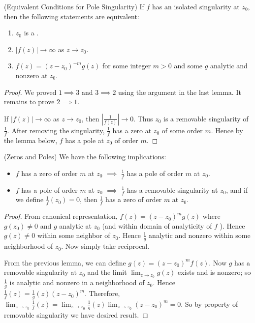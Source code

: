 \begin{theorem}(Equivalent Conditions for Pole Singularity)
	If $f$ has an isolated singularity at $z_0$, then the following statements are equivalent:
	\begin{enumerate}
		\item $z_0$ is a .
		\item $|f(z)| \to  \infty $ as $z \to  z_0$.
		\item $f(z) = (z-z_0)^{-m} g(z)$ for some integer $m>0$ and some $g$ analytic and nonzero at $z_0$.
	\end{enumerate}
\end{theorem}
\begin{proof}
	We proved $1 \implies 3$ and $3 \implies 2$ using the argument in the last lemma. It remains to prove $2 \implies 1$.

	If $|f(z)| \to \infty $ as $z \to  z_0$, then $|\frac{1}{f(z)}| \to  0$. Thus $z_0$ is a removable singularity of $\frac{1}{f}$. After removing the singularity, $\frac{1}{f}$ has a zero at $z_0$ of some order $m$. Hence by the lemma below, $f$ has a pole at $z_0$ of order $m$.
\end{proof}
\begin{lemma}(Zeros and Poles)
	We have the following implications:
	\begin{itemize}
		\item $f$ has a zero of order $m$ at $z_0$ $\implies$ $\frac{1}{f}$ has a pole of order $m$ at $z_0$.
		\item $f$ has a pole of order $m$ at $z_0$ $\implies$ $\frac{1}{f}$ has a removable singularity at $z_0$, and if we define $\frac{1}{f}(z_0) = 0$, then $\frac{1}{f}$ has a zero of order $m$ at $z_0$.
	\end{itemize}
\end{lemma}
\begin{proof}
	From canonical representation, $f(z) = (z-z_0)^m g(z)$ where $g(z_0)\neq 0$ and $g$ analytic at $z_0$ (and within domain of analyticity of  $f$ ). Hence $g(z)\neq 0$ within some neighbor of $z_0$. Hence $\frac{1}{g}$ analytic and nonzero within some neighborhood of $z_0$. Now simply take reciprocal.

	From the previous lemma, we can define  $g(z) = (z-z_0)^m f(z)$. Now $g$ has a removable singularity at $z_0$ and the limit $\lim_{z \to z_0} g(z)$ exists and is nonzero; so $\frac{1}{g}$ is analytic and nonzero in a neighborhood of $z_0$. Hence $\frac{1}{f}(z) = \frac{1}{g}(z) (z-z_0)^m$. Therefore, $\lim_{z \to z_0} \frac{1}{f}(z) = \lim_{z \to z_0} \frac{1}{g}(z) \lim_{z \to z_0} (z-z_0)^m = 0$. So by property of removable singularity we have desired result.
\end{proof}


